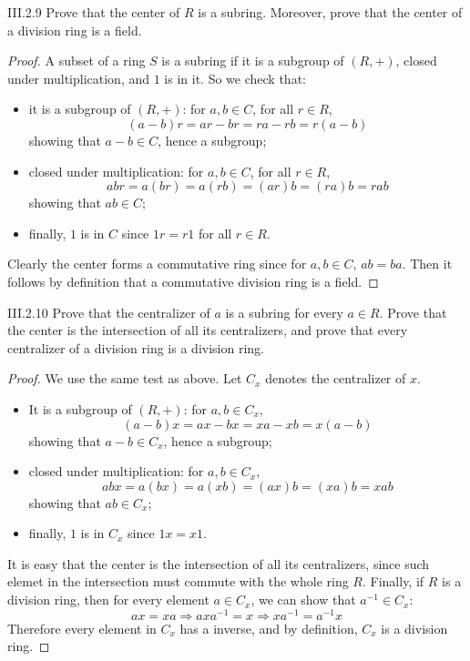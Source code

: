 \begin{problem}{III.2.9}
Prove that the center of $R$ is a subring. Moreover, prove that the center of a division ring is a field.
\end{problem}
\begin{proof}
A subset of a ring $S$ is a subring if it is a subgroup of $(R,+)$, closed under multiplication, and $1$ is in it. So we check that:
\begin{itemize}
\setlength\itemsep{0pt}
\item it is a subgroup of $(R,+)$: for $a,b \in C$, for all $r \in R$,
\[
(a-b)r = ar - br = ra - rb = r(a-b)    
\]
showing that $a-b \in C$, hence a subgroup;
\item closed under multiplication: for $a,b \in C$, for all $r \in R$,
\[
abr = a(br) = a(rb) = (ar)b = (ra)b = rab     
\]
showing that $ab \in C$;
\item finally, $1$ is in $C$ since $1r = r1$ for all $r \in R$.
\end{itemize}


Clearly the center forms a commutative ring since for $a,b \in C$, $ab = ba$. Then it follows by definition that a commutative division ring is a field. 
\end{proof}

\begin{problem}{III.2.10}
Prove that the centralizer of $a$ is a subring for every $a \in R$. Prove that the center is the intersection of all its centralizers, and prove that every centralizer of a division ring is a division ring.
\end{problem}
\begin{proof}
We use the same test as above. Let $C_x$ denotes the centralizer of $x$.
\begin{itemize}
\setlength\itemsep{0pt}
\item It is a subgroup of $(R,+)$: for $a,b \in C_x$,
\[
(a-b)x = ax - bx = xa - xb = x(a-b)    
\]
showing that $a-b \in C_x$, hence a subgroup;
\item closed under multiplication: for $a,b \in C_x$,
\[
abx = a(bx) = a(xb) = (ax)b = (xa)b = xab     
\]
showing that $ab \in C_x$;
\item finally, $1$ is in $C_x$ since $1x = x1$.
\end{itemize}
It is easy that the center is the intersection of all its centralizers, since such elemet in the intersection must commute with the whole ring $R$. Finally, if $R$ is a division ring, then for every element $a \in C_x$, we can show that $a^{-1} \in C_x$:
\[
ax = xa \Rightarrow axa^{-1} = x \Rightarrow xa^{-1} = a^{-1}x
\]
Therefore every element in $C_x$ has a inverse, and by definition, $C_x$ is a division ring.
\end{proof}

